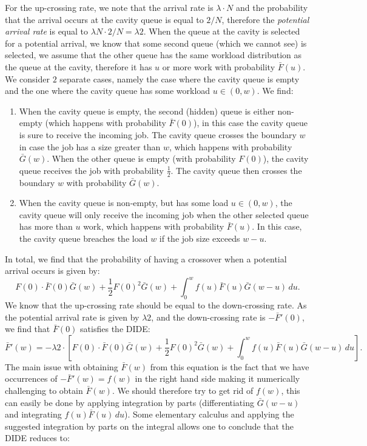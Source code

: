 \documentclass[12pt]{report}
\begin{document}
For the up-crossing rate, we note that the arrival rate is $\lambda \cdot N$ and the probability that the arrival occurs at the cavity queue is equal to $2/N$, therefore the \textit{potential arrival rate} is equal to $\lambda N \cdot 2/N = \lambda 2$. When the queue at the cavity is selected for a potential arrival, we know that some second queue (which we cannot see) is selected, we assume that the other queue has the same workload distribution as the queue at the cavity, therefore it has $u$ or more work with probability $\bar F(u)$. We consider $2$ separate cases, namely the case where the cavity queue is empty and the one where the cavity queue has some workload $u \in (0,w)$. We find:
\begin{enumerate}
\item When the cavity queue is empty, the second (hidden) queue is either non-empty (which happens with probability $\bar F(0)$), in this case the cavity queue is sure to receive the incoming job. The cavity queue crosses the boundary $w$ in case the job has a size greater than $w$, which happens with probability $\bar G(w)$. When the other queue is empty (with probability $F(0)$), the cavity queue receives the job with probability $\frac{1}{2}$. The cavity queue then crosses the boundary $w$ with probability $\bar G(w)$. 
\item When the cavity queue is non-empty, but has some load $u \in (0,w)$, the cavity queue will only receive the incoming job when the other selected queue has more than $u$ work, which happens with probability $\bar F(u)$. In this case, the cavity queue breaches the load $w$ if the job size exceeds $w-u$.
\end{enumerate}
In total, we find that the probability of having a crossover when a potential arrival occurs is given by:
$$
F(0) \cdot \bar F(0) \bar G(w) + \frac{1}{2} F(0)^2 \bar G(w) + \int_0^w f(u) \bar F(u) \bar G(w-u) \, du.
$$
We know that the up-crossing rate should be equal to the down-crossing rate. As the potential arrival rate is given by $\lambda 2$, and the down-crossing rate is $-\bar F'(0)$, we find that $\bar F(0)$ satisfies the DIDE:
$$
\bar F'(w) = - \lambda 2 \cdot \left[ F(0) \cdot \bar F(0) \bar G(w) + \frac{1}{2} F(0)^2 \bar G(w) + \int_0^w f(u) \bar F(u) \bar G(w-u) \, du \right].
$$
The main issue with obtaining $\bar F(w)$ from this equation is the fact that we have occurrences of $-\bar F'(w) = f(w)$ in the right hand side making it numerically challenging to obtain $\bar F(w)$. We should therefore try to get rid of $f(w)$, this can easily be done by applying integration by parts (differentiating $\bar G(w-u)$ and integrating $f(u) \bar F(u) \, du$). Some elementary calculus and applying the suggested integration by parts on the integral allows one to conclude that the DIDE reduces to:
\end{document}
